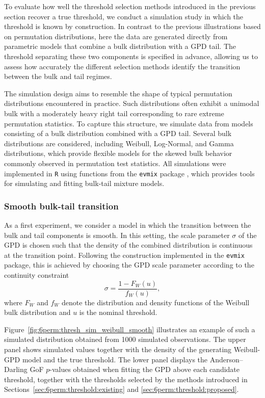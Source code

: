 To evaluate how well the threshold selection methods introduced in the previous section recover a true threshold, we conduct a simulation study in which the threshold is known by construction. In contrast to the previous illustrations based on permutation distributions, here the data are generated directly from parametric models that combine a bulk distribution with a GPD tail. The threshold separating these two components is specified in advance, allowing us to assess how accurately the different selection methods identify the transition between the bulk and tail regimes.

The simulation design aims to resemble the shape of typical permutation distributions encountered in practice. Such distributions often exhibit a unimodal bulk with a moderately heavy right tail corresponding to rare extreme permutation statistics. To capture this structure, we simulate data from models consisting of a bulk distribution combined with a GPD tail. Several bulk distributions are considered, including Weibull, Log-Normal, and Gamma distributions, which provide flexible models for the skewed bulk behavior commonly observed in permutation test statistics. All simulations were implemented in \texttt{R} using functions from the \texttt{evmix} package \citep{hu2018evmix}, which provides tools for simulating and fitting bulk-tail mixture models.

\subsubsection{Smooth bulk-tail transition}

As a first experiment, we consider a model in which the transition between the bulk and tail components is smooth. In this setting, the scale parameter $\sigma$ of the GPD is chosen such that the density of the combined distribution is continuous at the transition point. 
Following the construction implemented in the \texttt{evmix} package, this is achieved by choosing the GPD scale parameter according to the continuity constraint
\begin{equation}
\sigma = \frac{1 - F_W(u)}{f_W(u)},
\end{equation}
where $F_W$ and $f_W$ denote the distribution and density functions of the Weibull bulk distribution and $u$ is the nominal threshold.

Figure~\ref{fig:6perm:thresh_sim_weibull_smooth} illustrates an example of such a simulated distribution obtained from 1000 simulated observations. The upper panel shows simulated values together with the density of the generating Weibull-GPD model and the true threshold. The lower panel displays the Anderson--Darling GoF $p$-values obtained when fitting the GPD above each candidate threshold, together with the thresholds selected by the methods introduced in Sections~\ref{sec:6perm:threshold:existing} and \ref{sec:6perm:threshold:proposed}.

